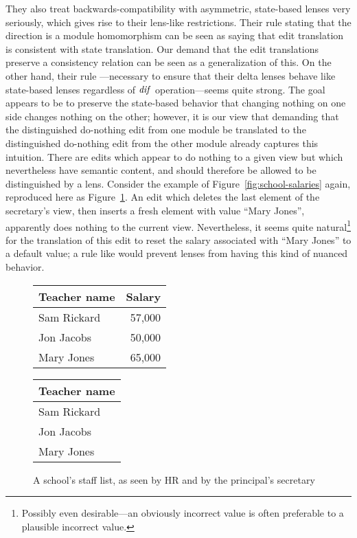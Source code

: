 They also treat backwards-compatibility with asymmetric, state-based lenses
very seriously, which gives rise to their lens-like restrictions.  Their
rule  stating that the \GET direction is a module homomorphism can
be seen as saying that edit translation is consistent with state
translation.  Our demand that the edit translations preserve a consistency
relation can be seen as a generalization of this. On the other hand, their
rule ---necessary to ensure that their delta lenses behave like
state-based lenses regardless of $\mathit{dif}$ operation---seems quite strong. The
goal appears to be to preserve the state-based behavior that changing
nothing on one side changes nothing on the other; however, it is our view
that demanding that the distinguished do-nothing edit from one module be
translated to the distinguished do-nothing edit from the other module
already captures this intuition. There are edits which appear to do nothing
to a given view but which nevertheless have semantic content, and should
therefore be allowed to be distinguished by a lens. Consider the example of
Figure~\ref{fig:school-salaries} again, reproduced here as
Figure~\ref{fig:school-salaries-delins}. An edit which deletes the last
element of the secretary's view, then inserts a fresh element with value
``Mary Jones'', apparently does nothing to the current view. Nevertheless,
it seems quite natural\footnote{Possibly even desirable---an obviously
incorrect value is often preferable to a plausible incorrect value.} for the
translation of this edit to reset the salary associated with ``Mary Jones''
to a default value; a rule like  would prevent lenses from having
this kind of nuanced behavior.

\begin{figure}
    \begin{minipage}{0.5\linewidth}
        \centering
        \begin{tabular}{lr}
            Teacher name & Salary \\
            \hline
            Sam Rickard & 57,000 \\
            Jon Jacobs & 50,000 \\
            Mary Jones & 65,000 \\
        \end{tabular}
        \label{fig:school-salaries-delins-hr}
    \end{minipage}%
    \begin{minipage}{0.5\linewidth}
        \centering
        \begin{tabular}{l}
            Teacher name \\
            \hline
            Sam Rickard \\
            Jon Jacobs \\
            Mary Jones \\
        \end{tabular}
        \label{fig:school-salaries-delins-sec-pre}
    \end{minipage}%
    \caption{A school's staff list, as seen by HR and by the principal's secretary}
    \label{fig:school-salaries-delins}
\end{figure}

